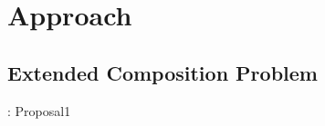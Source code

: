 \documentclass[senior,final,11pt]{iscs-thesis}
\begin{document}
\chapter{Approach}%

\section{Extended Composition Problem}: Proposal1 %
\end{document}

